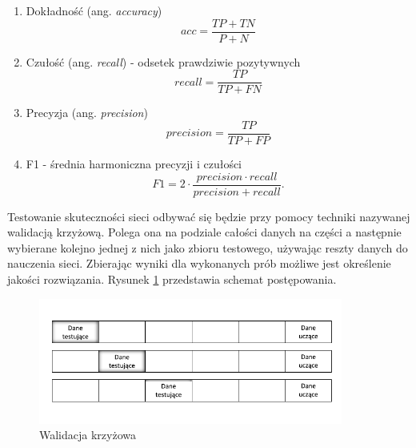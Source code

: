 \documentclass[inzynierska]{pwr_wmat_praca_dyplomowa}
\theoremstyle{plain}
\numberwithin{theorem}{chapter}
\theoremstyle{definition}
\numberwithin{theorem}{chapter}
\begin{document}
\begin{center}
	\begin{enumerate}
		\item Dokładność (ang. \textit{accuracy})
		\begin{equation}
		acc = \frac{TP + TN}{P + N}
		\end{equation}
		\item Czułość (ang. \textit{recall}) - odsetek prawdziwie pozytywnych
		\begin{equation}
		recall = \frac{TP}{TP + FN}
		\end{equation}
		\item Precyzja (ang. \textit{precision})
		\begin{equation}
		precision = \frac{TP}{TP + FP}
		\end{equation}
		\item F1 - średnia harmoniczna precyzji i czułości 
		\begin{equation}
		F1 = 2 \cdot \frac{precision \cdot recall}{precision + recall}.
		\end{equation}
	\end{enumerate}
	
\end{center}

Testowanie skuteczności sieci odbywać się będzie przy pomocy techniki nazywanej walidacją krzyżową. Polega ona na podziale całości danych na części a następnie wybierane kolejno jednej z nich jako zbioru testowego, używając reszty danych do nauczenia sieci. Zbierając wyniki dla wykonanych prób możliwe jest określenie jakości rozwiązania. Rysunek \ref{cross-validation} przedstawia schemat postępowania.
\begin{figure}[ht]
	\centering
	\includegraphics[width=10cm]{images/walidacja_c.pdf}
	\caption{Walidacja krzyżowa}
	\label{cross-validation}
\end{figure}
\end{document}
